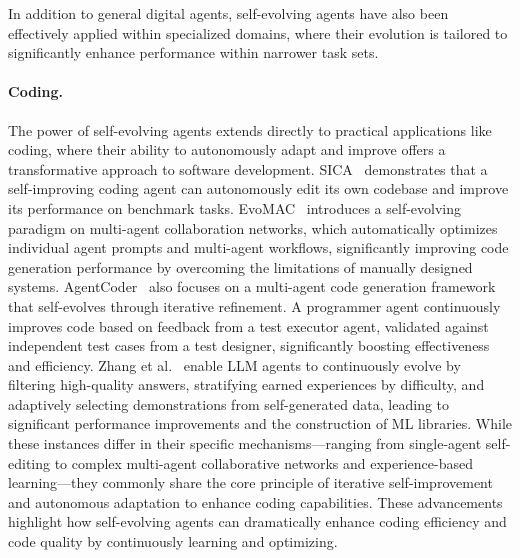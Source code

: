 In addition to general digital agents, self-evolving agents have also been effectively applied within specialized domains, where their evolution is tailored to significantly enhance performance within narrower task sets. 

\paragraph{Coding.}

The power of self-evolving agents extends directly to practical applications like coding, where their ability to autonomously adapt and improve offers a transformative approach to software development. SICA~\citep{robeyns2025self} demonstrates that a self-improving coding agent can autonomously edit its own codebase and improve its performance on benchmark tasks. EvoMAC~\citep{hu2024self} introduces a self-evolving paradigm on multi-agent collaboration networks, which automatically optimizes individual agent prompts and multi-agent workflows, significantly improving code generation performance by overcoming the limitations of manually designed systems. AgentCoder~\citep{huang2024agentcoder} also focuses on a multi-agent code generation framework that self-evolves through iterative refinement. A programmer agent continuously improves code based on feedback from a test executor agent, validated against independent test cases from a test designer, significantly boosting effectiveness and efficiency. Zhang et al.~\citep{zhang2025adaptive} enable LLM agents to continuously evolve by filtering high-quality answers, stratifying earned experiences by difficulty, and adaptively selecting demonstrations from self-generated data, leading to significant performance improvements and the construction of ML libraries. While these instances differ in their specific mechanisms—ranging from single-agent self-editing to complex multi-agent collaborative networks and experience-based learning—they commonly share the core principle of iterative self-improvement and autonomous adaptation to enhance coding capabilities. 
These advancements highlight how self-evolving agents can dramatically enhance coding efficiency and code quality by continuously learning and optimizing.

